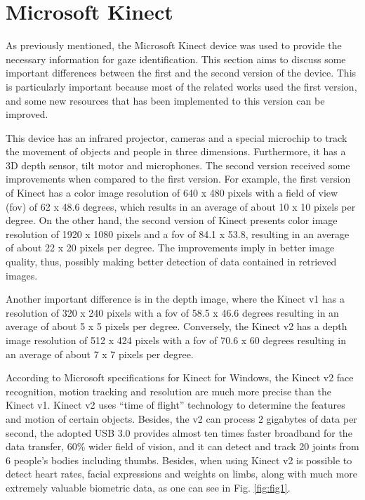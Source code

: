 \documentclass[10pt, conference]{IEEEtran}
\begin{document}
\section{Microsoft Kinect} \label{sec:technologyUsed}
    
	As previously mentioned, the Microsoft Kinect device was used to provide the necessary information for gaze identification.
	This section aims to discuss some important differences between the first and the second version of the device.
	This is particularly important because most of the related works used the first version, and some new resources that has been implemented to this version can be improved.

	This device has an infrared projector, cameras and a special microchip to track the movement of objects and people in three dimensions. 
	Furthermore, it has a 3D depth sensor, tilt motor and microphones.
	The second version received some improvements when compared to the first version. 
	For example, the first version of Kinect has a color image resolution of 640 x 480 pixels with a field of view (fov) of 62 x 48.6 degrees, which results in an average of about 10 x 10 pixels per degree. 
	On the other hand, the second version of Kinect presents color image resolution of 1920 x 1080 pixels and a fov of 84.1 x 53.8, resulting in an average of about 22 x 20 pixels per degree. 
	The improvements imply in better image quality, thus, possibly making better detection of data contained in retrieved images.

	Another important difference is in the depth image, where the Kinect v1 has a resolution of 320 x 240 pixels with a fov of 58.5 x 46.6 degrees resulting in an average of about 5 x 5 pixels per degree. 
	Conversely, the Kinect v2 has a depth image resolution of 512 x 424 pixels with a fov of 70.6 x 60 degrees resulting in an average of about 7 x 7 pixels per degree. 

	According to Microsoft specifications for Kinect for Windows, the Kinect v2 face recognition, motion tracking and resolution are much more precise than the Kinect v1. 
    Kinect v2 uses ``time of flight'' technology to determine the features and motion of certain objects. 
	Besides, the v2 can process 2 gigabytes of data per second, the adopted USB 3.0 provides almost ten times faster broadband for the data transfer, 60\% wider field of vision, and it can detect and track 20 joints from 6 people’s bodies including thumbs. 
	Besides, when using Kinect v2 is possible to detect heart rates, facial expressions and weights on limbs, along with much more extremely valuable biometric data, as one can see in Fig. \ref{fig:fig1}.
\end{document}
